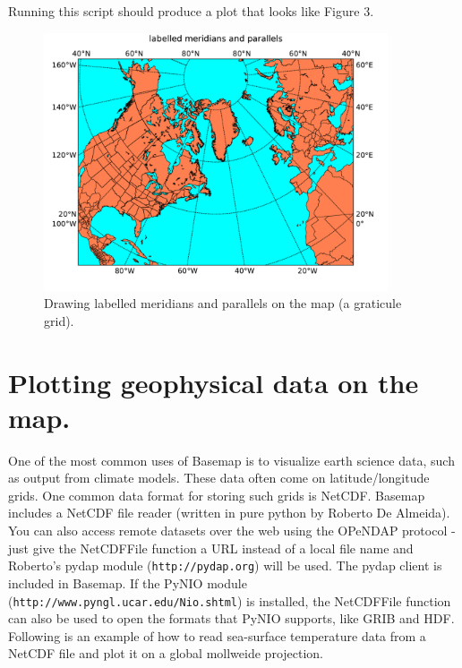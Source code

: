 

Running this script should produce a plot that looks like Figure 3.

\begin{figure}[h]
\includegraphics[width=4in]{fig/basemap4}

\caption{Drawing labelled meridians and parallels on the map (a graticule grid).}

\end{figure}


\section{Plotting geophysical data on the map.}

One of the most common uses of Basemap is to visualize earth science
data, such as output from climate models. These data often come on
latitude/longitude grids. One common data format for storing such
grids is NetCDF.  Basemap includes a NetCDF file reader (written in
pure python by Roberto De Almeida). 
You can also access remote datasets over the web using the OPeNDAP
protocol - just give the NetCDFFile function a URL instead of a local file name
and Roberto's pydap module (\texttt{http://pydap.org}) will be used.
The pydap client is included in Basemap.
If the PyNIO module (\texttt{http://www.pyngl.ucar.edu/Nio.shtml}) is installed, the 
NetCDFFile function can also be used to open the formats that 
PyNIO supports, like GRIB and HDF.
Following is an example
of how to read sea-surface temperature data from a NetCDF file and
plot it on a global mollweide projection.



